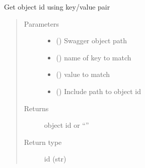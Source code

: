 \documentclass[letterpaper,10pt,english]{sphinxmanual}
\begin{document}
\begin{fulllineitems}
\begin{fulllineitems}
\label{\detokenize{b1ddi-class:bloxone.b1ddi.get_id}}
\sphinxAtStartPar
Get object id using key/value pair
\begin{quote}\begin{description}
\item[{Parameters}] \leavevmode\begin{itemize}
\item {} 
\sphinxAtStartPar
{} () \textendash{} Swagger object path

\item {} 
\sphinxAtStartPar
{} () \textendash{} name of key to match

\item {} 
\sphinxAtStartPar
{} () \textendash{} value to match

\item {} 
\sphinxAtStartPar
{} () \textendash{} Include path to object id

\end{itemize}

\item[{Returns}] \leavevmode
\sphinxAtStartPar
object id or “”

\item[{Return type}] \leavevmode
\sphinxAtStartPar
id (str)

\end{description}\end{quote}

\end{fulllineitems}



\end{fulllineitems}
\end{document}
